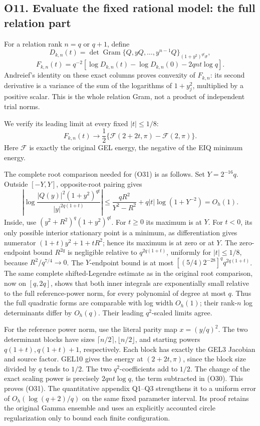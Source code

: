 \documentclass[
  11pt,
]{article}
\begin{document}
\subsection{O11. Evaluate the fixed rational model: the full relation
part}\label{o11.-evaluate-the-fixed-rational-model-the-full-relation-part}

For a relation rank \(n=q\) or \(q+1\), define \[
D_{k,n}(t)=\det\operatorname{Gram}
\{Q,yQ,\ldots,y^{n-1}Q\}_{(1+y^2)^{qt}\sigma},
\] \[
F_{k,n}(t)=q^{-2}
\left[\log D_{k,n}(t)-\log D_{k,n}(0)-2qnt\log q\right].\tag{O30}
\] Andreief's identity on these exact columns proves convexity of
\(F_{k,n}\): its second derivative is a variance of the sum of the
logarithms of \(1+y_j^2\), multiplied by a positive scalar. This is the
whole relation Gram, not a product of independent trial norms.

We verify its leading limit at every fixed \(|t|\le1/8\): \[
\boxed{F_{k,n}(t)\longrightarrow
\frac12\{\mathcal F(2+2t,\pi)-\mathcal F(2,\pi)\}.}\tag{O31}
\] Here \(\mathcal F\) is exactly the original GEL energy, the negative
of the EIQ minimum energy.

The complete root comparison needed for (O31) is as follows. Set
\(Y=2^{-16}q\). Outside \([-Y,Y]\), opposite-root pairing gives \[
\left|\log\frac{|Q(y)|^2(1+y^2)^{qt}}
{|y|^{2q(1+t)}}\right|
\le \frac{qR^2}{Y^2-R^2}+q|t|\log(1+Y^{-2})=O_h(1).
\tag{O32}
\] Inside, use \((y^2+R^2)^q(1+y^2)^{qt}\). For \(t\ge0\) its maximum is
at \(Y\). For \(t<0\), its only possible interior stationary point is a
minimum, as differentiation gives numerator \((1+t)y^2+1+tR^2\); hence
its maximum is at zero or at \(Y\). The zero-endpoint bound \(R^{2q}\)
is negligible relative to \(q^{2q(1+t)}\), uniformly for \(|t|\le1/8\),
because \(R^2/q^{7/4}\to0\). The \(Y\)-endpoint bound is at most
\([(5/4)2^{-28}]^q q^{2q(1+t)}\). The same complete shifted-Legendre
estimate as in the original root comparison, now on \([q,2q]\), shows
that both inner integrals are exponentially small relative to the full
reference-power norm, for every polynomial of degree at most \(q\). Thus
the full quadratic forms are comparable with log width \(O_h(1)\); their
rank-\(n\) log determinants differ by \(O_h(q)\). Their leading
\(q^2\)-scaled limits agree.

For the reference power norm, use the literal parity map \(x=(y/q)^2\).
The two determinant blocks have sizes
\(\lceil n/2\rceil,\lfloor n/2\rfloor\), and starting powers
\(q(1+t),q(1+t)+1\), respectively. Each block has exactly the GEL3
Jacobian and source factor. GEL10 gives the energy at \((2+2t,\pi)\),
since the block size divided by \(q\) tends to \(1/2\). The two
\(q^2\)-coefficients add to \(1/2\). The change of the exact scaling
power is precisely \(2qnt\log q\), the term subtracted in (O30). This
proves (O31). The quantitative appendix Q1--Q3 strengthens it to a
uniform error of \(O_h(\log(q+2)/q)\) on the same fixed parameter
interval. Its proof retains the original Gamma ensemble and uses an
explicitly accounted circle regularization only to bound each finite
configuration.
\end{document}
